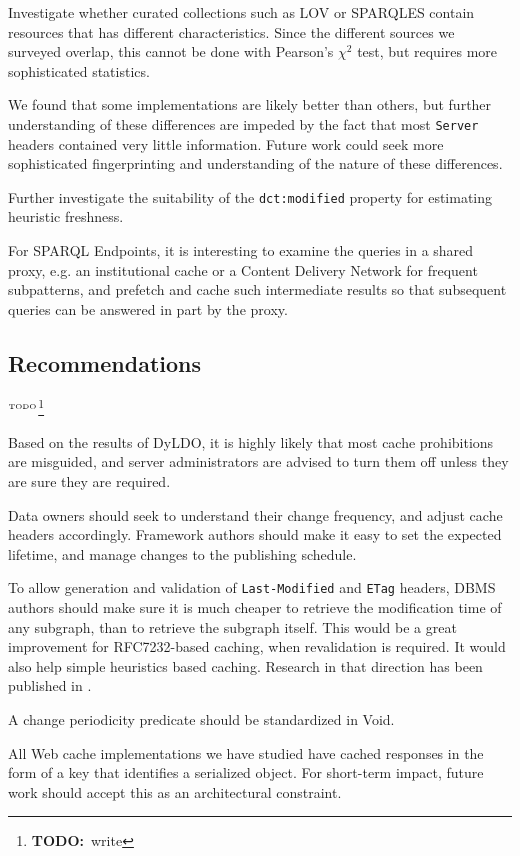 \documentclass{llncs}
\newcommand{\rdfterm}[1]{\texttt{#1}}
\newcommand{\httph}[1]{\texttt{#1}}
\newcommand{\todo}[1]{\ensuremath{^{\textrm{\tiny{TODO}\normalsize}}}\footnote{\textbf{TODO:}~#1}}
\begin{document}
Investigate whether curated collections such as LOV or SPARQLES
contain resources that has different characteristics. Since the
different sources we surveyed overlap, this cannot be done with
Pearson's $\chi^2$ test, but requires more sophisticated statistics.

We found that some implementations are likely better than others, but
further understanding of these differences are impeded by the fact
that most \httph{Server} headers contained very little
information. Future work could seek more sophisticated fingerprinting
and understanding of the nature of these differences.

Further investigate the suitability of the \rdfterm{dct:modified}
property for estimating heuristic freshness.

For SPARQL Endpoints, it is interesting to examine the queries in a
shared proxy, e.g. an institutional cache or a Content
Delivery Network for frequent subpatterns, and prefetch and cache such
intermediate results so that subsequent queries can be answered in
part by the proxy.


\subsection{Recommendations}\todo{write}

Based on the results of DyLDO, it is highly likely that most cache
prohibitions are misguided, and server administrators are advised to
turn them off unless they are sure they are required.

Data owners should seek to understand their change frequency, and
adjust cache headers accordingly. Framework authors should make it
easy to set the expected lifetime, and manage changes to the
publishing schedule.

To allow generation and validation of \httph{Last-Modified} and
\httph{ETag} headers, DBMS authors should make sure it is much cheaper
to retrieve the modification time of any subgraph, than to retrieve
the subgraph itself. This would be a great improvement for
RFC7232-based caching, when revalidation is required. It would also
help simple heuristics based caching. Research in that direction has
been published in \cite{kaseicache}.

A change periodicity predicate should be standardized in Void.

All Web cache implementations we have studied have cached responses in
the form of a key that identifies a serialized object. For short-term
impact, future work should accept this as an architectural constraint.
\end{document}

